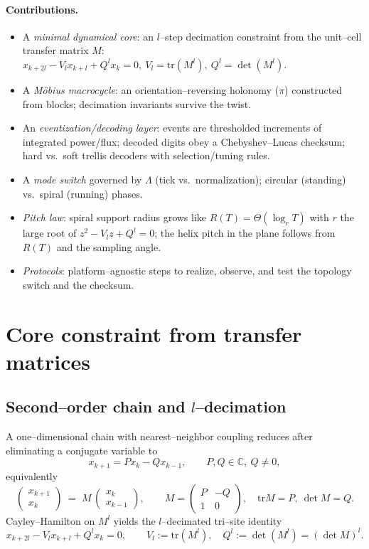 \documentclass[11pt]{article}
\theoremstyle{definition}
\theoremstyle{remark}
\newcommand{\C}{\mathbb{C}}
\newcommand{\tr}{\mathrm{tr}}
\begin{document}
\paragraph{Contributions.}
\begin{itemize}
\item A \emph{minimal dynamical core}: an $l$--step decimation constraint from the unit--cell transfer matrix $M$:
\(
x_{k+2l}-V_l x_{k+l}+Q^l x_k=0,\ V_l=\tr(M^l),\ Q^l=\det(M^l).
\)
\item A \emph{Möbius macrocycle}: an orientation--reversing holonomy ($\pi$) constructed from blocks; decimation invariants survive the twist.
\item An \emph{eventization/decoding layer}: events are thresholded increments of integrated power/flux; decoded digits obey a Chebyshev--Lucas checksum;
hard vs.\ soft trellis decoders with selection/tuning rules.
\item A \emph{mode switch} governed by $\Lambda$ (tick vs.\ normalization); circular (standing) vs.\ spiral (running) phases.
\item \emph{Pitch law}: spiral support radius grows like $R(T)=\Theta(\log_r T)$ with $r$ the large root of $z^2-V_l z+Q^l=0$;
the helix pitch in the plane follows from $R(T)$ and the sampling angle.
\item \emph{Protocols}: platform--agnostic steps to realize, observe, and test the topology switch and the checksum.
\end{itemize}

\section{Core constraint from transfer matrices}
\subsection{Second--order chain and $l$--decimation}
A one--dimensional chain with nearest--neighbor coupling reduces after eliminating a conjugate variable to
\begin{equation}\label{eq:secondorder}
x_{k+1}=P x_k - Q x_{k-1},\qquad P,Q\in\C,\ Q\neq 0,
\end{equation}
equivalently
\begin{equation}\label{eq:transfer}
\begin{pmatrix}x_{k+1}\\ x_k\end{pmatrix}
\;=\;
M\,\begin{pmatrix}x_k\\ x_{k-1}\end{pmatrix},
\qquad
M=\begin{pmatrix}P&-Q\\[3pt]1&0\end{pmatrix},\quad \tr M=P,\ \det M=Q.
\end{equation}
Cayley--Hamilton on $M^l$ yields the $l$--decimated tri--site identity
\begin{equation}\label{eq:trisite}
x_{k+2l}-V_l x_{k+l}+Q^l x_k=0,\qquad V_l:=\tr(M^l),\quad Q^l:=\det(M^l)=(\det M)^l.
\end{equation}
\end{document}
